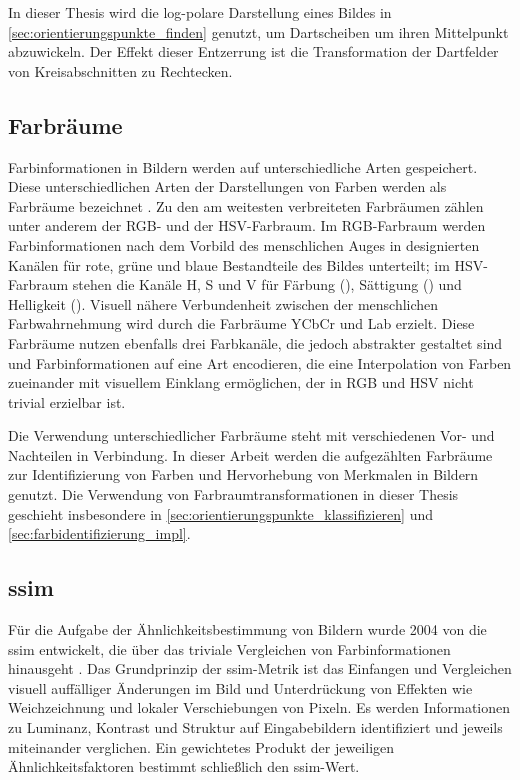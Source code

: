In dieser Thesis wird die log-polare Darstellung eines Bildes in \autoref{sec:orientierungspunkte_finden} genutzt, um Dartscheiben um ihren Mittelpunkt abzuwickeln. Der Effekt dieser Entzerrung ist die Transformation der Dartfelder von Kreisabschnitten zu Rechtecken.


\subsection{Farbräume}
\label{sec:farbräume}

Farbinformationen in Bildern werden auf unterschiedliche Arten gespeichert. Diese unterschiedlichen Arten der Darstellungen von Farben werden als Farbräume bezeichnet \cite{color_space,cv_general}. Zu den am weitesten verbreiteten Farbräumen zählen unter anderem der RGB- und der HSV-Farbraum. Im RGB-Farbraum werden Farbinformationen nach dem Vorbild des menschlichen Auges in designierten Kanälen für rote, grüne und blaue Bestandteile des Bildes unterteilt; im HSV-Farbraum stehen die Kanäle H, S und V für Färbung (), Sättigung () und Helligkeit (). Visuell nähere Verbundenheit zwischen der menschlichen Farbwahrnehmung wird durch die Farbräume YCbCr und Lab erzielt. Diese Farbräume nutzen ebenfalls drei Farbkanäle, die jedoch abstrakter gestaltet sind und Farbinformationen auf eine Art encodieren, die eine Interpolation von Farben zueinander mit visuellem Einklang ermöglichen, der in RGB und HSV nicht trivial erzielbar ist.

Die Verwendung unterschiedlicher Farbräume steht mit verschiedenen Vor- und Nachteilen in Verbindung. In dieser Arbeit werden die aufgezählten Farbräume zur Identifizierung von Farben und Hervorhebung von Merkmalen in Bildern genutzt. Die Verwendung von Farbraumtransformationen in dieser Thesis geschieht insbesondere in \autoref{sec:orientierungspunkte_klassifizieren} und \autoref{sec:farbidentifizierung_impl}.


\newpage
\subsection{\acl{ssim}}
\label{sec:ssim}

Für die Aufgabe der Ähnlichkeitsbestimmung von Bildern wurde 2004 von \citeauthor{ssim} die \acf{ssim} entwickelt, die über das triviale Vergleichen von Farbinformationen hinausgeht \cite{ssim,cv_general}. Das Grundprinzip der \ac{ssim}-Metrik ist das Einfangen und Vergleichen visuell auffälliger Änderungen im Bild und Unterdrückung von Effekten wie Weichzeichnung und lokaler Verschiebungen von Pixeln. Es werden Informationen zu Luminanz, Kontrast und Struktur auf Eingabebildern identifiziert und jeweils miteinander verglichen. Ein gewichtetes Produkt der jeweiligen Ähnlichkeitsfaktoren bestimmt schließlich den \ac{ssim}-Wert.

